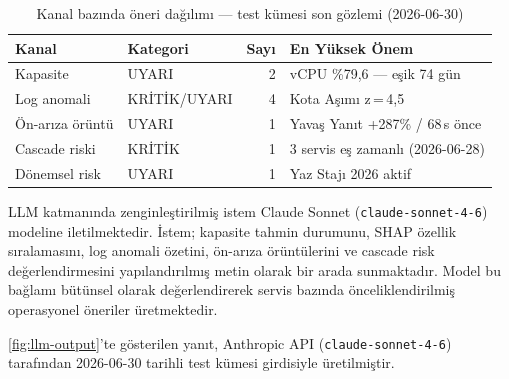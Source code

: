 \begin{table}[htbp]
    \centering
    \caption{Kanal bazında öneri dağılımı — test kümesi son gözlemi (2026-06-30)}
    \label{tab:oneri-kanal}
    \begin{tabular}{llrl}
        \textbf{Kanal} & \textbf{Kategori} & \textbf{Sayı} & \textbf{En Yüksek Önem} \\
        \hline
        Kapasite        & UYARI    & 2 & vCPU \%79{,}6 — eşik 74 gün \\
        Log anomali     & KRİTİK/UYARI & 4 & Kota Aşımı z\,=\,4{,}5 \\
        Ön-arıza örüntü & UYARI   & 1 & Yavaş Yanıt +287\% / 68\,s önce \\
        Cascade riski   & KRİTİK  & 1 & 3 servis eş zamanlı (2026-06-28) \\
        Dönemsel risk   & UYARI   & 1 & Yaz Stajı 2026 aktif \\
    \end{tabular}
\end{table}

LLM katmanında zenginleştirilmiş istem Claude Sonnet (\texttt{claude-sonnet-4-6}) modeline iletilmektedir.
İstem; kapasite tahmin durumunu, SHAP özellik sıralamasını, log anomali özetini, ön-arıza örüntülerini ve cascade risk değerlendirmesini yapılandırılmış metin olarak bir arada sunmaktadır.
Model bu bağlamı bütünsel olarak değerlendirerek servis bazında önceliklendirilmiş operasyonel öneriler üretmektedir.

\autoref{fig:llm-output}'te gösterilen yanıt, Anthropic API (\texttt{claude-sonnet-4-6}) tarafından 2026-06-30 tarihli test kümesi girdisiyle üretilmiştir.


